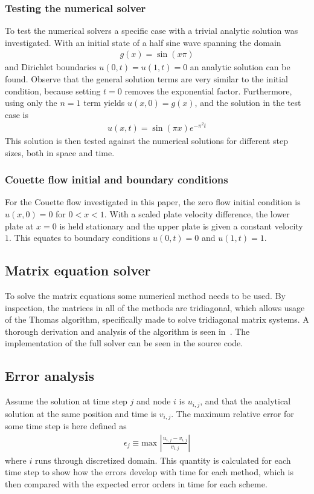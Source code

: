 \documentclass[aps,reprint]{revtex4-1}
\begin{document}
\subsubsection{Testing the numerical solver}
To test the numerical solvers a specific case with a trivial analytic solution
was investigated. With an initial state of a half sine wave spanning the domain
\begin{align*}
  g(x) = \sin{(x \pi)}
\end{align*}
and Dirichlet boundaries $u(0,t) = u(1,t) = 0$ an analytic solution can be found.
Observe that the general solution terms are very similar to the initial condition,
because setting $t = 0$ removes the exponential factor. Furthermore, using only
the $n = 1$ term yields $u(x,0) = g(x)$, and the solution in the test case is
\begin{align*}
  u(x,t) = \sin{(\pi x)} e^{- \pi^2 t}
\end{align*}
This solution is then tested against the numerical solutions for different step
sizes, both in space and time.
\subsubsection{Couette flow initial and boundary conditions}
For the Couette flow investigated in this paper, the zero flow initial condition
is $u(x,0) = 0$ for $0 < x < 1$. With a scaled plate velocity difference, the
lower plate at $x = 0$ is held stationary and the upper plate is given a constant
velocity $1$. This equates to boundary conditions $u(0,t) = 0$ and $u(1,t) = 1$.
\subsection{Matrix equation solver}
To solve the matrix equations some numerical method needs to be used. By inspection,
the matrices in all of the methods are tridiagonal, which allows usage of the
Thomas algorithm, specifically made to solve tridiagonal matrix systems. A
thorough derivation and analysis of the algorithm is seen in~\cite{project1}. The
implementation of the full solver can be seen in the source code.
\subsection{Error analysis}
Assume the solution at time step $j$ and node $i$ is $u_{i,j}$, and that the analytical
solution at the same position and time is $v_{i,j}$. The maximum relative error for some
time step is here defined as
\begin{align*}
  \epsilon_j \equiv \text{max }\left| \frac{u_{i,j} - v_{i,j}}{v_{i,j}}\right|
\end{align*}
where $i$ runs through discretized domain. This quantity is calculated for each
time step to show how the errors develop with time for each method, which is
then compared with the expected error orders in time for each scheme.
\end{document}
